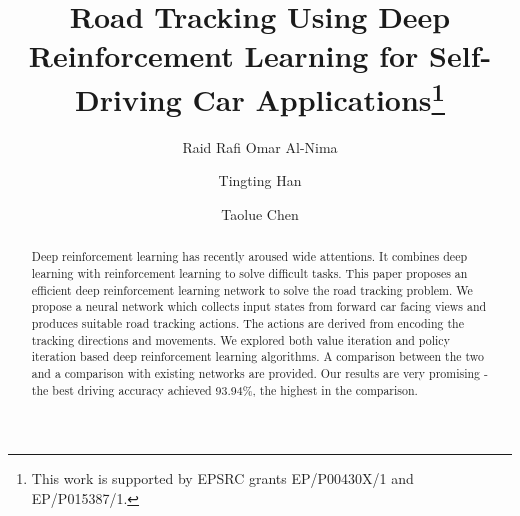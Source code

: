 \documentclass{svproc}
\begin{document}
	\mainmatter              %
	\title{Road Tracking Using Deep Reinforcement Learning for Self-Driving Car Applications\thanks{This work is supported by EPSRC grants EP/P00430X/1 and EP/P015387/1.}}
	\author{Raid Rafi Omar Al-Nima \and Tingting Han \and 
		Taolue Chen}
	\maketitle              %
	\begin{abstract}
		Deep reinforcement learning has recently aroused wide attentions. It combines deep learning with reinforcement learning to solve difficult tasks. This paper proposes an efficient deep reinforcement learning network to solve the road tracking problem. We propose a neural network which collects input states from forward car facing views and produces suitable road tracking actions. The actions are derived from encoding the tracking directions and movements. We explored both value iteration and policy iteration based deep reinforcement learning algorithms. A comparison between the two and a comparison with existing networks are provided. Our results are very promising - the best driving accuracy achieved 93.94\%, the highest in the comparison. 
	\end{abstract}
\end{document}
